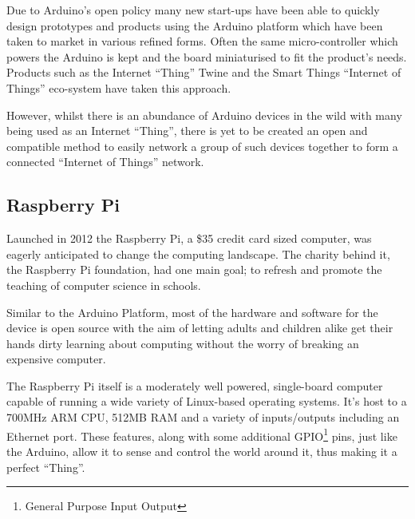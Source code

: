 Due to Arduino's open policy many new start-ups have been able to quickly design prototypes and products using the Arduino platform which have been taken to market in various refined forms. Often the same micro-controller which powers the Arduino is kept and the board miniaturised to fit the product's needs. Products such as the Internet ``Thing'' Twine\cite{Twine} and the Smart Things ``Internet of Things'' eco-system have taken this approach\cite{SmartThings}.

However, whilst there is an abundance of Arduino devices in the wild with many being used as an Internet ``Thing'', there is yet to be created an open and compatible method to easily network a group of such devices together to form a connected ``Internet of Things'' network.

\newpage
\subsection{Raspberry Pi} %
\label{sub:raspberry_pi}
Launched in 2012 the Raspberry Pi, a \$35 credit card sized computer, was eagerly anticipated to change the computing landscape. The charity behind it, the Raspberry Pi foundation, had one main goal; to refresh and promote the teaching of computer science in schools.

Similar to the Arduino Platform, most of the hardware and software for the device is open source with the aim of letting adults and children alike get their hands dirty learning about computing without the worry of breaking an expensive computer.

The Raspberry Pi itself is a moderately well powered, single-board computer capable of running a wide variety of Linux-based operating systems. It's host to a 700MHz ARM CPU, 512MB RAM and a variety of inputs/outputs including an Ethernet port. These features, along with some additional GPIO\footnote{General Purpose Input Output} pins, just like the Arduino, allow it to sense and control the world around it, thus making it a perfect ``Thing''.

